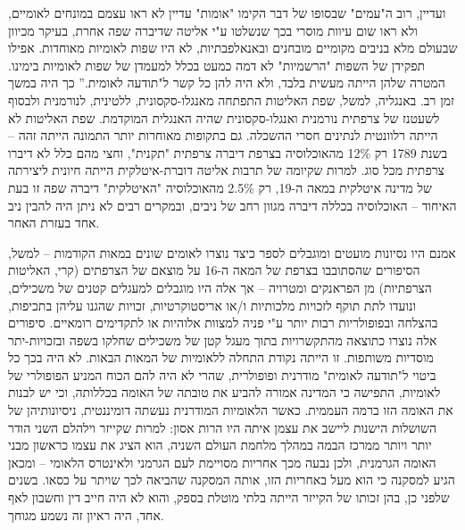 ועדיין, רוב ה"עמים" שבסופו של דבר הקימו "אומות" עדיין לא ראו עצמם במונחים לאומיים, ולא ראו שום עיוות מוסרי בכך שנשלטו ע"י אליטה שדיברה שפה אחרת, בעיקר מכיוון שבעולם מלא בניבים מקומיים מובחנים ובאנאלפבתיות, לא היו שפות לאומיות מאוחדות. אפילו תפקידן של השפות "הרשמיות" לא דמה כמעט בכלל למעמדן של שפות לאומיות בימינו. המטרה שלהן הייתה מעשית בלבד, ולא היה להן כל קשר ל"תודעה לאומית.” כך היה במשך זמן רב. באנגליה, למשל, שפת האליטות התפתחה מאנגלו-סקסונית, ללטינית, לנורמנית ולבסוף לשעטנז של צרפתית נורמנית ואנגלו-סקסונית שהיה האנגלית המוקדמת. שפת האליטות לא הייתה רלוונטית לנתינים חסרי ההשכלה. גם בתקופות מאוחרות יותר התמונה הייתה זהה – בשנת 1789 רק 12\% מהאוכלוסיה בצרפת דיברה צרפתית "תקנית", וחצי מהם כלל לא דיברו צרפתית מכל סוג. למרות שקיומה של תרבות אליטה דוברת-איטלקית הייתה חיונית ליצירתה של מדינה איטלקית במאה ה-19, רק 2.5\% מהאוכלוסיה "האיטלקית" דיברה שפה זו בעת האיחוד – האוכלוסיה בכללה דיברה מגוון רחב של ניבים, ובמקרים רבים לא ניתן היה להבין ניב אחד בעזרת האחר.

אמנם היו נסיונות מועטים ומוגבלים לספר כיצד נוצרו לאומים שונים במאות הקודמות – למשל, הסיפורים שהסתובבו בצרפת של המאה ה-16 על מוצאם של הצרפתים (קרי, האליטות הצרפתיות) מן הפראנקים ומטרויה – אך אלה היו מוגבלים למעגלים קטנים של משכילים, ונועדו לתת תוקף לזכויות מלכותיות ו/או אריסטוקרטיות, זכויות שהגנו עליהן בתכיפות, בהצלחה ובפופולריות רבות יותר ע"י פניה למצוות אלוהיות או לתקדימים רומאיים. סיפורים אלה נוצרו כתוצאה מהתקשרויות בתוך מעגל קטן של משכילים שחלקו בשפה ובזכויות-יתר מוסדיות משותפות. זו הייתה נקודת התחלה ללאומיות של המאות הבאות. לא היה בכך כל ביטוי ל"תודעה לאומית" מודרנית ופופולרית, שהרי לא היה להם הכוח המניע הפופולרי של לאומיות, התפישה כי המדינה אמורה להביע את טובתה של האומה בכללותה, וכי יש לבנות את האומה הזו ברמה העממית. כאשר הלאומיות המודרנית נעשתה דומיננטית, ניסיונותיהן של השושלות הישנות ליישב את עצמן איתה היו הרות אסון: למרות שקייזר וילהלם השני הודר יותר ויותר ממרכז הבמה במהלך מלחמת העולם השניה, הוא הציג את עצמו כראשון מבני האומה הגרמנית, ולכן נבעה מכך אחריות מסויימת לעם הגרמני ולאינטרס הלאומי – ומכאן הגיע למסקנה כי הוא מעל באחריות הזו, אותה המסקנה שהביאה לכך שויתר על כסאו. בשנים שלפני כן, בהן זכותו של הקייזר הייתה בלתי מוטלת בספק, והוא לא היה חייב דין וחשבון לאף אחד, היה ראיון זה נשמע מגוחך.


